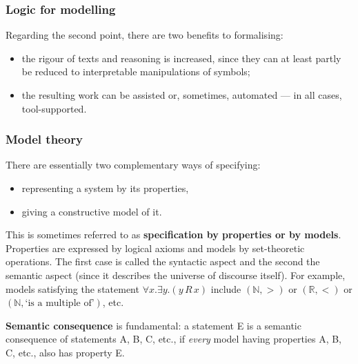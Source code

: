 \documentclass[compress,dvipdfmx]{beamer}
\begin{document}
%
\begin{frame}
\frametitle{Logic for modelling}

Regarding the second point, there are two benefits to formalising:
\begin{itemize}

  \item the rigour of texts and reasoning is increased, since they
  can at least partly be reduced to interpretable manipulations of
  symbols;

  \item the resulting work can be assisted or, sometimes,
  automated --- in all cases, tool-supported.

\end{itemize}

\end{frame}

%
\begin{frame}
\frametitle{Model theory}

There are essentially two complementary ways of specifying:
\begin{itemize}

  \item representing a system by its properties,

  \item giving a constructive model of it.

\end{itemize}

This is sometimes referred to as \textbf{specification by properties
  or by models}. Properties are expressed by logical axioms and models
by set\hyp{}theoretic operations. The first case is called the
syntactic aspect and the second the semantic aspect (since it
describes the universe of discourse itself). For example, models
satisfying the statement $\forall x.\exists y.(y \, R \, x)$ include
$(\mathbb{N},>)$ or $(\mathbb{R},<)$ or $(\mathbb{N},\mbox{`is a
  multiple of'})$, etc.

\bigskip

\textbf{Semantic consequence} is fundamental: a statement E is a
semantic consequence of statements A, B, C, etc., if \emph{every}
model having properties A, B, C, etc., also has property E.

\end{frame}
\end{document}
